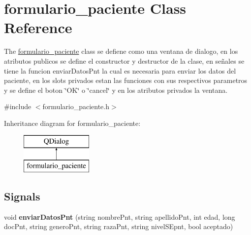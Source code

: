 \hypertarget{classformulario__paciente}{}\section{formulario\+\_\+paciente Class Reference}
\label{classformulario__paciente}


The \hyperlink{classformulario__paciente}{formulario\+\_\+paciente} class se defiene como una ventana de dialogo, en los atributos publicos se define el constructor y destructor de la clase, en señales se tiene la funcion enviar\+Datos\+Pnt la cual es necesaria para enviar los datos del paciente, en los slots privados estan las funciones con sus respectivos parametros y se define el boton \char`\"{}\+O\+K\char`\"{} o \char`\"{}cancel\char`\"{} y en los atributos privados la ventana.  




{\ttfamily \#include $<$formulario\+\_\+paciente.\+h$>$}

Inheritance diagram for formulario\+\_\+paciente\+:\begin{figure}[H]
\begin{center}
\leavevmode
\includegraphics[height=2.000000cm]{classformulario__paciente}
\end{center}
\end{figure}
\subsection*{Signals}
\begin{DoxyCompactItemize}
\item 
\mbox{\label{classformulario__paciente_a40f4ae3f9eda97e8b57609c0a91e1184}} 
void {\bfseries enviar\+Datos\+Pnt} (string nombre\+Pnt, string apellido\+Pnt, int edad, long doc\+Pnt, string genero\+Pnt, string raza\+Pnt, string nivel\+S\+Epnt, bool aceptado)
\end{DoxyCompactItemize}
